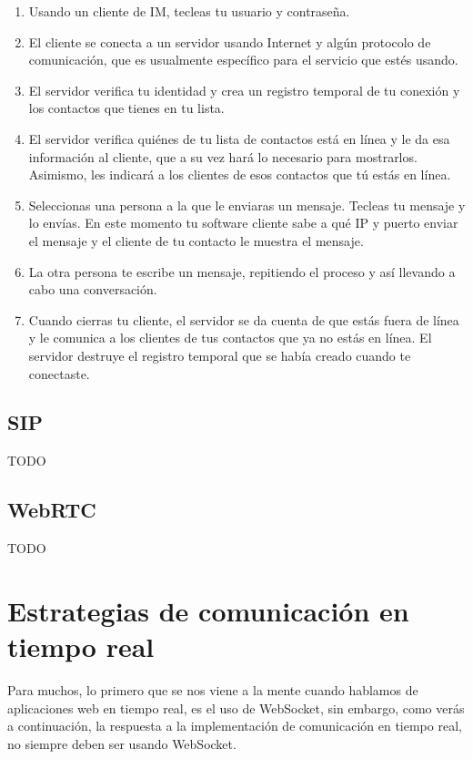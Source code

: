 \begin{enumerate}
  \item Usando un cliente de IM, tecleas tu usuario y contraseña.
  \item El cliente se conecta a un servidor usando Internet y algún protocolo de comunicación, que es usualmente específico para el servicio que estés usando.
  \item El servidor verifica tu identidad y crea un registro temporal de tu conexión y los contactos que tienes en tu lista.
  \item El servidor verifica quiénes de tu lista de contactos está en línea y le da esa información al cliente, que a su vez hará lo necesario para mostrarlos. Asimismo, les indicará a los clientes de esos contactos que tú estás en línea.
  \item Seleccionas una persona a la que le enviaras un mensaje. Tecleas tu mensaje y lo envías. En este momento tu software cliente sabe a qué IP y puerto enviar el mensaje y el cliente de tu contacto le muestra el mensaje.
  \item La otra persona te escribe un mensaje, repitiendo el proceso y así llevando a cabo una conversación.
  \item Cuando cierras tu cliente, el servidor se da cuenta de que estás fuera de línea y le comunica a los clientes de tus contactos que ya no estás en línea. El servidor destruye el registro temporal que se había creado cuando te conectaste.
\end{enumerate}

\subsection{SIP}

TODO

\subsection{WebRTC}

TODO

\section{Estrategias de comunicación en tiempo real}

Para muchos, lo primero que se nos viene a la mente cuando hablamos de aplicaciones web en tiempo real, es el uso de WebSocket, sin embargo, como verás a continuación, la respuesta a la implementación de comunicación en tiempo real, no siempre deben ser usando WebSocket.

